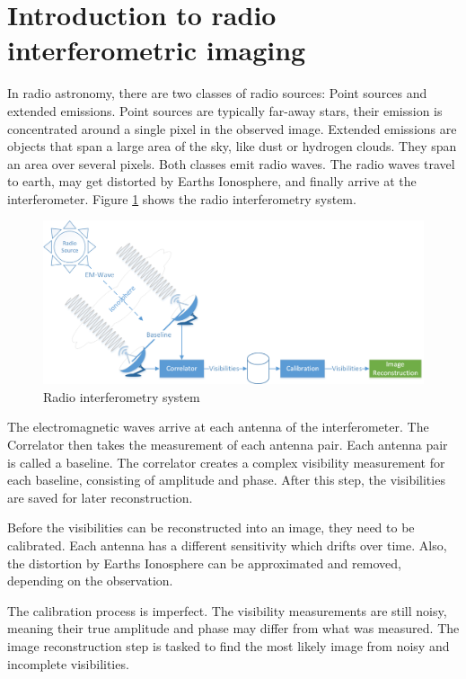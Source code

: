 \section{Introduction to radio interferometric imaging}\label{radio}
In radio astronomy, there are two classes of radio sources: Point sources and extended emissions. Point sources are typically far-away stars, their emission is concentrated around a single pixel in the observed image. Extended emissions are objects that span a large area of the sky, like dust or hydrogen clouds. They span an area over several pixels. Both classes emit radio waves. The radio waves travel to earth, may get distorted by Earths Ionosphere, and finally arrive at the interferometer. Figure \ref{intro:system} shows the radio interferometry system.

\begin{figure}[h]
	\centering
	\includegraphics[width=0.80\linewidth]{./chapters/01.intro/system.png}
	\caption{Radio interferometry system}
	\label{intro:system}
\end{figure}

The electromagnetic waves arrive at each antenna of the interferometer. The Correlator then takes the measurement of each antenna pair. Each antenna pair is called a baseline. The correlator creates a complex visibility measurement for each baseline, consisting of amplitude and phase. After this step, the visibilities are saved for later reconstruction.

Before the visibilities can be reconstructed into an image, they need to be calibrated. Each antenna has a different sensitivity which drifts over time. Also,  the distortion by Earths Ionosphere can be approximated and removed, depending on the observation. 

The calibration process is imperfect. The visibility measurements are still noisy, meaning their true amplitude and phase may differ from what was measured. The image reconstruction step is tasked to find the most likely image from noisy and incomplete visibilities.

